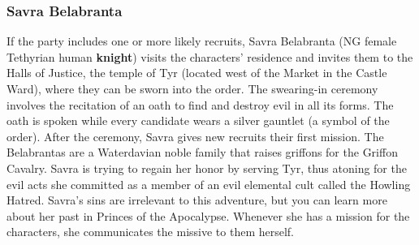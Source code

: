 \documentclass[10pt,a4paper,twoside,twocolumn,openany,nodeprecatedcode]{dndbook}
\begin{document}
\subsubsection{Savra Belabranta}
If the party includes one or more likely recruits, Savra Belabranta (NG female Tethyrian human \textbf{knight}) visits the characters' residence and invites them to the Halls of Justice, the temple of Tyr (located west of the Market in the Castle Ward), where they can be sworn into the order. The swearing-in ceremony involves the recitation of an oath to find and destroy evil in all its forms. The oath is spoken while every candidate wears a silver gauntlet (a symbol of the order). After the ceremony, Savra gives new recruits their first mission.
The Belabrantas are a Waterdavian noble family that raises griffons for the Griffon Cavalry. Savra is trying to regain her honor by serving Tyr, thus atoning for the evil acts she committed as a member of an evil elemental cult called the Howling Hatred. Savra's sins are irrelevant to this adventure, but you can learn more about her past in Princes of the Apocalypse. Whenever she has a mission for the characters, she communicates the missive to them herself.
\end{document}

